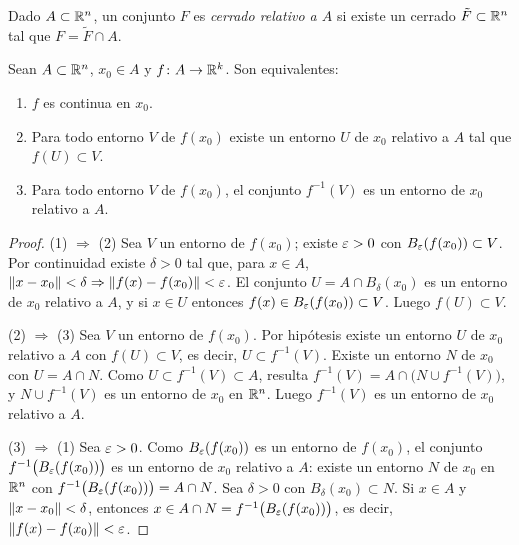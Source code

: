 \begin{definition}
  Dado \(A \subset \mathbb{R}^n\), un conjunto \(F\) es \emph{cerrado relativo a \(A\)} si existe un cerrado \(\tilde{F} \subset \mathbb{R}^n\) tal que \(F = \tilde{F} \cap A\).
\end{definition}

\begin{prop}
  Sean \(A \subset \mathbb{R}^n\), \(x_0 \in A\) y \(f\colon A \to \mathbb{R}^k\). Son equivalentes:
  \begin{enumerate}[label=(\arabic*)]
    \item \(f\) es continua en \(x_0\).
    \item Para todo entorno \(V\) de \(f(x_0)\) existe un entorno \(U\) de \(x_0\) relativo a \(A\) tal que \(f(U) \subset V\).
    \item Para todo entorno \(V\) de \(f(x_0)\), el conjunto \(f^{-1}(V)\) es un entorno de \(x_0\) relativo a \(A\).
  \end{enumerate}
\end{prop}

\begin{proof}
  (1) \(\Rightarrow\) (2) Sea \(V\) un entorno de \(f(x_0)\); existe \(\varepsilon > 0\) con \(B_{\varepsilon}(f(x_0)) \subset V\). Por continuidad existe \(\delta > 0\) tal que, para \(x \in A\), \(\left\lVert x - x_0 \right\rVert < \delta \Rightarrow \left\lVert f(x) - f(x_0) \right\rVert < \varepsilon\). El conjunto \(U = A \cap B_{\delta}(x_0)\) es un entorno de \(x_0\) relativo a \(A\), y si \(x \in U\) entonces \(f(x) \in B_{\varepsilon}(f(x_0)) \subset V\). Luego \(f(U) \subset V\).

  (2) \(\Rightarrow\) (3) Sea \(V\) un entorno de \(f(x_0)\). Por hipótesis existe un entorno \(U\) de \(x_0\) relativo a \(A\) con \(f(U) \subset V\), es decir, \(U \subset f^{-1}(V)\). Existe un entorno \(N\) de \(x_0\) con \(U = A \cap N\). Como \(U \subset f^{-1}(V) \subset A\), resulta \(f^{-1}(V) = A \cap \bigl( N \cup f^{-1}(V) \bigr)\), y \(N \cup f^{-1}(V)\) es un entorno de \(x_0\) en \(\mathbb{R}^n\). Luego \(f^{-1}(V)\) es un entorno de \(x_0\) relativo a \(A\).

  (3) \(\Rightarrow\) (1) Sea \(\varepsilon > 0\). Como \(B_{\varepsilon}(f(x_0))\) es un entorno de \(f(x_0)\), el conjunto \(f^{-1}\bigl( B_{\varepsilon}(f(x_0)) \bigr)\) es un entorno de \(x_0\) relativo a \(A\): existe un entorno \(N\) de \(x_0\) en \(\mathbb{R}^n\) con \(f^{-1}\bigl( B_{\varepsilon}(f(x_0)) \bigr) = A \cap N\). Sea \(\delta > 0\) con \(B_{\delta}(x_0) \subset N\). Si \(x \in A\) y \(\left\lVert x - x_0 \right\rVert < \delta\), entonces \(x \in A \cap N = f^{-1}\bigl( B_{\varepsilon}(f(x_0)) \bigr)\), es decir, \(\left\lVert f(x) - f(x_0) \right\rVert < \varepsilon\).
\end{proof}

